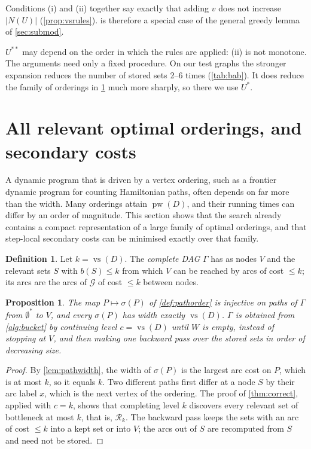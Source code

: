 \documentclass[11pt]{article}
\newtheorem{proposition}[theorem]{Proposition}
\theoremstyle{definition}
\newtheorem{definition}[theorem]{Definition}
\newcommand{\vs}{\operatorname{vs}}
\newcommand{\pw}{\operatorname{pw}}
\newcommand{\Rel}{\mathcal{R}}
\newcommand{\Gr}{\mathcal{G}}
\newcommand{\bott}{b}
\begin{document}
Conditions (i) and (ii) together say exactly that adding $v$ does not
increase $|N(U)|$ (\cref{prop:vsrules}).  is therefore a
special case of the general greedy lemma of \cref{sec:submod}.

$U^{**}$ may depend on the order in which the rules are applied: (ii) is
not monotone. The arguments need only a fixed procedure. On our test graphs
the stronger expansion reduces the number of stored sets 2--6 times
(\cref{tab:bab}). It does reduce the family of orderings in
\cref{sec:orders} much more sharply, so there we use $U^*$.

\section{All relevant optimal orderings, and secondary costs}\label{sec:orders}

A dynamic program that is driven by a vertex ordering, such as a
frontier dynamic program for counting Hamiltonian paths, often depends on
far more than the width. Many orderings attain $\pw(D)$, and their running
times can differ by an order of magnitude. This section shows that the
search already contains a compact representation of a large family of
optimal orderings, and that step-local secondary costs can be minimised
exactly over that family.

\begin{definition}\label{def:gamma}
Let $k=\vs(D)$. The \emph{complete DAG} $\Gamma$ has as nodes $V$ and the
relevant sets $S$ with $\bott(S)\le k$ from which $V$ can be reached by arcs
of cost $\le k$; its arcs are the arcs of $\Gr$ of cost $\le k$ between
nodes.
\end{definition}

\begin{proposition}\label{prop:gamma}
The map $P\mapsto\sigma(P)$ of \cref{def:pathorder} is injective on paths
of $\Gamma$ from $\emptyset^*$ to $V$, and every $\sigma(P)$ has width
exactly $\vs(D)$. $\Gamma$ is obtained from \cref{alg:bucket} by continuing
level $c=\vs(D)$ until $W$ is empty, instead of stopping at $V$, and then
making one backward pass over the stored sets in order of decreasing size.
\end{proposition}
\begin{proof}
By \cref{lem:pathwidth}, the width of $\sigma(P)$ is the largest arc cost
on $P$, which is at most $k$, so it equals $k$. Two different paths first
differ at a node $S$ by their arc label $x$, which is the next vertex of
the ordering. The proof of \cref{thm:correct}, applied with $c=k$, shows
that completing level $k$ discovers every relevant set of bottleneck at most
$k$, that is, $\Rel_k$. The backward pass keeps the sets with an arc of cost
$\le k$ into a kept set or into $V$; the arcs out of $S$ are recomputed
from $S$ and need not be stored.
\end{proof}
\end{document}

